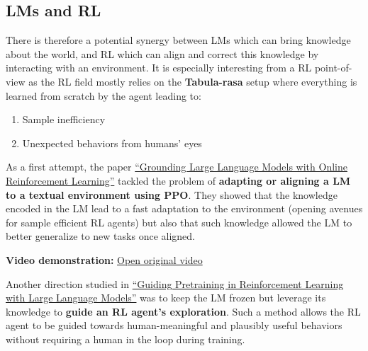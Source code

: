 \documentclass[11pt,a4paper]{article}
\begin{document}
\subsection{LMs and RL}\label{lms-and-rl}

There is therefore a potential synergy between LMs which can bring knowledge about the world, and RL which can align and correct this knowledge by interacting with an environment. It is especially interesting from a RL point-of-view as the RL field mostly relies on the \textbf{Tabula-rasa} setup where everything is learned from scratch by the agent leading to:

\begin{enumerate}
\def\labelenumi{\arabic{enumi})}
\item
  Sample inefficiency
\item
  Unexpected behaviors from humans' eyes
\end{enumerate}

As a first attempt, the paper \href{https://arxiv.org/abs/2302.02662v1}{``Grounding Large Language Models with Online Reinforcement Learning''} tackled the problem of \textbf{adapting or aligning a LM to a textual environment using PPO}. They showed that the knowledge encoded in the LM lead to a fast adaptation to the environment (opening avenues for sample efficient RL agents) but also that such knowledge allowed the LM to better generalize to new tasks once aligned.

\textbf{Video demonstration:} \href{https://huggingface.co/datasets/huggingface-deep-rl-course/course-images/resolve/main/en/unit12/papier_v4.mp4}{Open original video}

Another direction studied in \href{https://arxiv.org/abs/2302.06692}{``Guiding Pretraining in Reinforcement Learning with Large Language Models''} was to keep the LM frozen but leverage its knowledge to \textbf{guide an RL agent's exploration}. Such a method allows the RL agent to be guided towards human-meaningful and plausibly useful behaviors without requiring a human in the loop during training.

\end{document}
